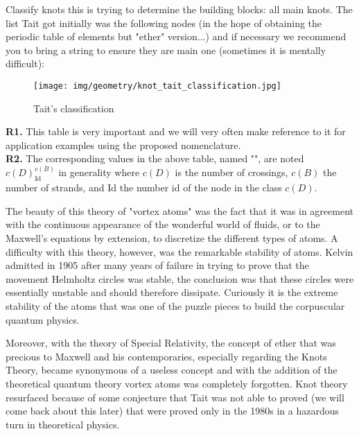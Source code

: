 {	Classify knots this is trying to determine the building blocks: all main knots. The list Tait got initially was the following nodes (in the hope of obtaining the periodic table of elements but "ether" version...) and if necessary we recommend you to bring a string to ensure they are main one (sometimes it is mentally difficult):
	\begin{figure}[H]
		\centering
		\texttt{[image: img/geometry/knot\_tait\_classification.jpg]}
		\caption{Tait's classification}
	\end{figure}
	\begin{tcolorbox}[title=Remarks,colframe=black,arc=10pt]
	\textbf{R1.} This table is very important and we will very often make reference to it for application examples using the proposed nomenclature.\\
	
	\textbf{R2.} The corresponding values in the above table, named "", are noted $c(D)_{\text{Id}}^{c(B)}$ in generality where $c(D)$ is the number of crossings, $c(B)$ the number of strands, and $\text{Id}$ the number id of the node in the class $c(D)$.
	\end{tcolorbox}
	The beauty of this theory of "vortex atoms" was the fact that it was in agreement with the continuous appearance of the wonderful world of fluids, or to the Maxwell's equations by extension, to discretize the different types of atoms. A difficulty with this theory, however, was the remarkable stability of atoms. Kelvin admitted in 1905 after many years of failure in trying to prove that the movement Helmholtz circles was stable, the conclusion was that these circles were essentially unstable and should therefore dissipate. Curiously it is the extreme stability of the atoms that was one of the puzzle pieces to build the corpuscular quantum physics.
	
	Moreover, with the theory of Special Relativity, the concept of ether that was precious to Maxwell and his contemporaries, especially regarding the Knots Theory, became synonymous of a useless concept and with the addition of the theoretical quantum theory vortex atoms was completely forgotten. Knot theory resurfaced because of some conjecture that Tait was not able to proved (we will come back about this later) that were proved only in the 1980s in a hazardous turn in theoretical physics.
	
}

